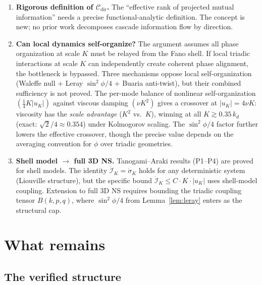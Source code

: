 \documentclass[11pt]{article}
\theoremstyle{definition}
\theoremstyle{remark}
\begin{document}
\begin{enumerate}
  \item \textbf{Rigorous definition of $\mathcal{C}_{\mathrm{dir}}$.}
    The ``effective rank of projected mutual information'' needs a
    precise functional-analytic definition. The concept is new; no
    prior work decomposes cascade information flow by direction.

  \item \textbf{Can local dynamics self-organize?} The argument assumes
    all phase organization at scale $K$ must be relayed from the Fano
    shell. If local triadic interactions at scale $K$ can independently
    create coherent phase alignment, the bottleneck is bypassed.
    Three mechanisms oppose local self-organization
    (Waleffe null + Leray $\sin^2\phi/4$ + Buaria anti-twist), but
    their combined sufficiency is not proved. The per-mode balance of
    nonlinear self-organization $(\tfrac{1}{4}K|u_K|)$ against viscous
    damping $(\nu K^2)$ gives a crossover at $|u_K| = 4\nu K$: viscosity
    has the \emph{scale advantage} ($K^2$ vs.\ $K$), winning at all
    $K \gtrsim 0.35\,k_d$ (exact: $\sqrt{2}/4 \approx 0.354$) under
    Kolmogorov scaling. The $\sin^2\phi/4$ factor further lowers the
    effective crossover, though the precise value depends on the
    averaging convention for $\phi$ over triadic geometries.

  \item \textbf{Shell model $\to$ full 3D NS.} Tanogami--Araki results
    (\textsc{P1}--\textsc{P4}) are proved for shell models. The
    identity $\dot{\mathcal{I}}_K = \dot{\sigma}_K$ holds for any
    deterministic system (Liouville structure), but the specific bound
    $\dot{\mathcal{I}}_K \leq C \cdot K \cdot |u_K|$ uses shell-model
    coupling. Extension to full 3D NS requires bounding the triadic
    coupling tensor $B(k,p,q)$, where $\sin^2\phi/4$ from
    Lemma~\ref{lem:leray} enters as the structural cap.
\end{enumerate}

\section{What remains}

\subsection{The verified structure}
\end{document}
